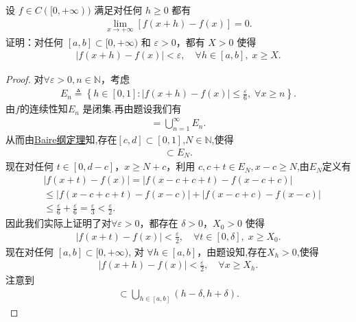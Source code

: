 \documentclass[../../main.tex]{subfiles}%
\begin{document}
\begin{example}
设 $f \in C([0, +\infty))$ 满足对任何 $h \geqslant 0$ 都有
\begin{align*}
\lim\limits_{x \to +\infty} [f(x+h) - f(x)] = 0.
\end{align*}
证明：对任何 $[a, b] \subset [0, +\infty)$ 和 $\varepsilon > 0$，都有 $X > 0$ 使得
\begin{align*}
|f(x+h) - f(x)| < \varepsilon, \quad \forall h \in [a, b], \; x \geqslant X.
\end{align*}
\end{example}
\begin{proof}

对$\forall \varepsilon > 0, n \in \mathbb{N}$，考虑
\begin{align*}
E_n \triangleq \left\{ h \in [0, 1] : |f(x + h) - f(x)| \leqslant \frac{\varepsilon}{6}, \; \forall x \geqslant n \right\}.
\end{align*}
由$f$的连续性知$E_n$ 是闭集.再由题设我们有
\begin{align*}
[0, 1] = \bigcup\limits_{n=1}^{\infty} E_n.
\end{align*}
从而由\hyperref[theorem:Baire纲定理]{Baire纲定理}知,存在$[c, d] \subset [0, 1]$,$N \in \mathbb{N}$,使得
\begin{align*}
[c, d] \subset E_N.
\end{align*}
现在对任何 $t \in [0, d - c]$，$x \geqslant N + c$，利用 $c, c + t \in E_N,x-c\geqslant N$,由$E_N$定义有
\begin{align*}
&|f(x + t) - f(x)| = |f(x - c + c + t) - f(x - c + c)| \\
&\leqslant |f(x - c + c + t) - f(x - c)| + |f(x - c + c) - f(x - c)| \\
&\leqslant \frac{\varepsilon}{6} + \frac{\varepsilon}{6} = \frac{\varepsilon}{3} < \frac{\varepsilon}{2}.
\end{align*}
因此我们实际上证明了对$\forall \varepsilon > 0$，都存在 $\delta > 0$，$X_0 > 0$ 使得
\begin{align}
|f(x + t) - f(x)| < \frac{\varepsilon}{2}, \quad \forall t \in [0, \delta], \; x \geqslant X_0. \label{step1}
\end{align}
现在对任何 $[a, b]\subset [0,+\infty)$,
对 $\forall h \in [a, b]$，由题设知,存在$X_h > 0$,使得
\begin{align}
|f(x + h) - f(x)| < \frac{\varepsilon}{2}, \quad \forall x \geqslant X_h. \label{step2}
\end{align}
注意到
\begin{align*}
[a, b] \subset \bigcup\limits_{h \in [a, b]} (h - \delta, h + \delta).

\end{align*}
\end{proof}
\end{document}
